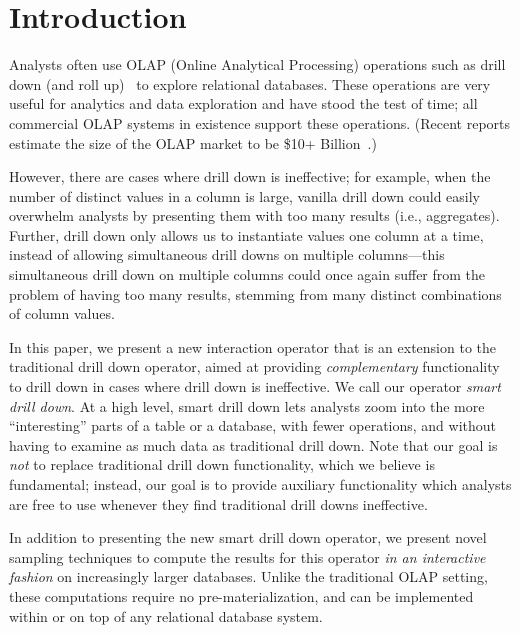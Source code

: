\documentclass[10pt,journal,compsoc]{IEEEtran}
\newcounter{prob}
\begin{document}
\maketitle

\section{Introduction}
Analysts often use OLAP (Online Analytical Processing) operations
such as drill down (and roll up)~\cite{export:69578} to explore
relational databases. 
These operations are very useful for analytics and data exploration and have stood the test of time;
all commercial OLAP systems 
in existence support these operations. (Recent reports estimate the size of the OLAP market to be \$10+ Billion~\cite{gartner}.)


However, there are cases where drill down is ineffective; 
for example, when the number of distinct values
in a column is large, vanilla drill down 
could easily overwhelm analysts by presenting them with too many 
results (i.e., aggregates). 
Further, drill down only allows us to instantiate values
 one column at a time, instead of allowing simultaneous drill downs
on multiple columns---this simultaneous drill down on multiple columns 
could once again suffer from the problem
of having too many results, stemming from many distinct combinations of column values.

In this paper, we present a new interaction operator 
that is an extension to the traditional 
drill down operator, aimed at providing {\em complementary}
functionality to drill down in cases where drill down is
ineffective. We call our operator {\em smart drill down}.
At a high level, smart drill down lets analysts zoom into
the more ``interesting'' parts of a table or a database,
with fewer operations, and without having to examine as much
data as traditional drill down.
Note that our goal is {\em not} to replace traditional 
drill down functionality, which we believe is fundamental;
instead, our goal is to provide auxiliary functionality 
which analysts are free to use whenever they find 
traditional drill downs ineffective.

In addition to presenting the new smart drill down operator, we present novel sampling techniques to compute the results for this
operator {\em in an interactive fashion} on increasingly larger databases. 
Unlike the traditional OLAP setting, these computations 
require no pre-materialization, and can be implemented 
within or on top of any relational database system.
\end{document}
